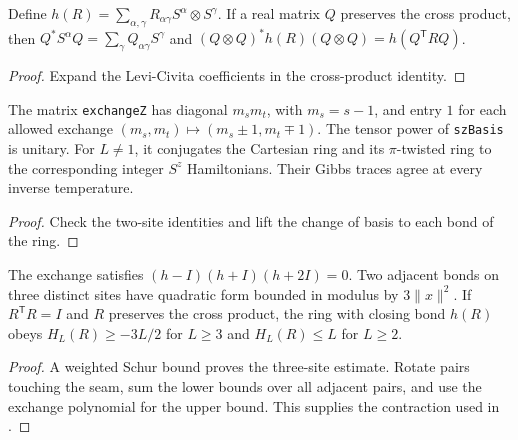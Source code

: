 \begin{lemma}
  \label{lem:spin1-rotations}
  \leanok
  Define \(h(R)=\sum_{\alpha,\gamma}R_{\alpha\gamma}S^\alpha\otimes S^\gamma\).
  If a real matrix \(Q\) preserves the cross product, then
  \(Q^*S^\alpha Q=\sum_\gamma Q_{\alpha\gamma}S^\gamma\) and
  \((Q\otimes Q)^*h(R)(Q\otimes Q)=h(Q^{\mathsf T}RQ)\).
\end{lemma}
\begin{proof}
  \leanok
  Expand the Levi-Civita coefficients in the cross-product identity.
\end{proof}

\begin{lemma}
  \label{lem:spin1-sz}
  \leanok
  The matrix \texttt{exchangeZ} has diagonal \(m_sm_t\), with \(m_s=s-1\), and entry \(1\)
  for each allowed exchange \((m_s,m_t)\mapsto(m_s\pm1,m_t\mp1)\).
  The tensor power of \texttt{szBasis} is unitary.
  For \(L\ne1\), it conjugates the Cartesian ring and its \(\pi\)-twisted ring to the corresponding
  integer \(S^z\) Hamiltonians. Their Gibbs traces agree at every inverse temperature.
\end{lemma}
\begin{proof}
  \leanok
  Check the two-site identities and lift the change of basis to each bond of the ring.
\end{proof}

\begin{lemma}
  \label{lem:spin1-energy}
  \leanok
  The exchange satisfies \((h-I)(h+I)(h+2I)=0\).
  Two adjacent bonds on three distinct sites have quadratic form bounded in modulus by
  \(3\|x\|^2\).
  If \(R^{\mathsf T}R=I\) and \(R\) preserves the cross product, the ring with closing bond
  \(h(R)\) obeys \(H_L(R)\ge-3L/2\) for \(L\ge3\) and \(H_L(R)\le L\) for \(L\ge2\).
\end{lemma}
\begin{proof}
  \leanok
  A weighted Schur bound proves the three-site estimate. Rotate pairs touching the seam,
  sum the lower bounds over all adjacent pairs, and use the exchange polynomial for the upper
  bound. This supplies the contraction used in \cite[Appendices A and B]{OpenAIHaldane}.
\end{proof}

